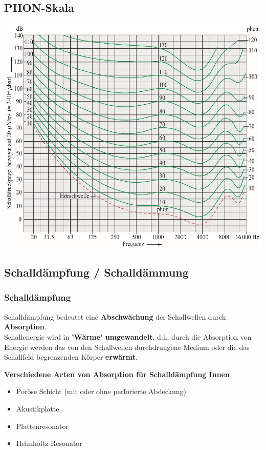 \subsection{PHON-Skala}
\includegraphics[width=0.75\linewidth]{Bilder/Wellen-Optik/phon_skala}



\subsection{Schalldämpfung / Schalldämmung}

\subsubsection{Schalldämpfung}

Schalldämpfung bedeutet eine \textbf{Abschwächung} der Schallwellen durch
\textbf{Absorption}. \\ Schallenergie wird in \textbf{'Wärme' umgewandelt}, d.h. durch die
Absorption von Energie werden das von den Schallwellen
durchdrungene Medium oder die das Schallfeld begrenzenden Körper
\textbf{erwärmt}. \\
\vspace{0.2cm}

\textbf{Verschiedene Arten von Absorption für Schalldämpfung Innen} \\

\begin{itemize}
	\item Poröse Schicht (mit oder ohne perforierte Abdeckung) 
	\item Akustikplatte 
	\item Plattenresonator
	\item Helmholtz-Resonator
\end{itemize}


